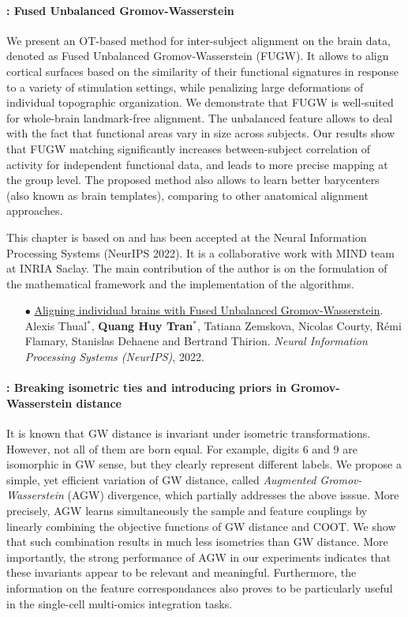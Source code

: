 \paragraph{: Fused Unbalanced Gromov-Wasserstein}

We present an OT-based method for inter-subject alignment on the brain data,
denoted as Fused Unbalanced Gromov-Wasserstein (FUGW). It allows to align cortical surfaces based
on the similarity of their functional signatures in response to a variety of stimulation settings,
while penalizing large deformations of individual topographic organization. We demonstrate that
FUGW is well-suited for whole-brain landmark-free alignment. The unbalanced feature allows
to deal with the fact that functional areas vary in size across subjects. Our results show that
FUGW matching significantly increases between-subject correlation of activity for independent
functional data, and leads to more precise mapping at the group level.
The proposed method also allows to learn better barycenters (also known as brain templates),
comparing to other anatomical alignment approaches.

This chapter is based on \citep{Thual22} and has been accepted at the
Neural Information Processing Systems (NeurIPS 2022).
It is a collaborative work with MIND team at INRIA Saclay.
The main contribution of the author is on the formulation of the mathematical framework
and the implementation of the algorithms.

\begin{itemize}
    \item[$\bullet$] \ul{Aligning individual brains with Fused Unbalanced Gromov-Wasserstein}.
     Alexis Thual$^*$, \textbf{Quang Huy Tran$^*$}, Tatiana Zemskova, Nicolas Courty,
     Rémi Flamary, Stanislas Dehaene and  Bertrand Thirion.
     \textit{Neural Information Processing Systems (NeurIPS)}, 2022.
\end{itemize}

\paragraph{: Breaking isometric ties and introducing priors in
Gromov-Wasserstein distance}

It is known that GW distance is invariant under isometric transformations. However,
not all of them are born equal. For example, digits 6 and 9 are isomorphic in GW sense,
but they clearly represent different labels. We propose a simple,
yet efficient variation of GW distance, called \textit{Augmented Gromov-Wasserstein} (AGW) divergence,
which partially addresses the above isssue.
More precisely, AGW learns simultaneously the sample and feature couplings by
linearly combining the objective functions of GW distance and COOT.
We show that such combination results in much less isometries than GW distance.
More importantly, the strong performance of AGW in our experiments indicates
that these invariants appear to be relevant and meaningful.
Furthermore, the information on the feature correspondances also proves to be particularly useful
in the single-cell multi-omics integration tasks.

